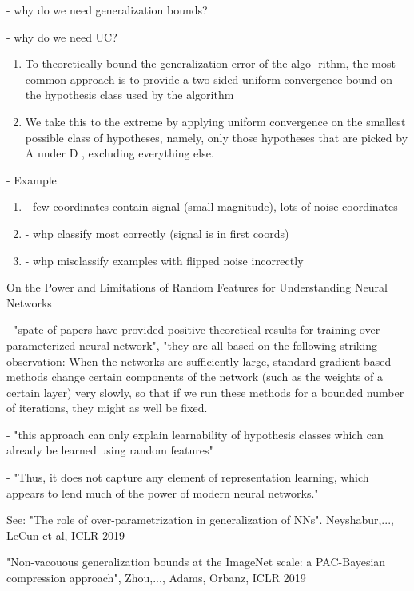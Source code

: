 \documentclass[english]{article}
\begin{document}
- why do we need generalization bounds?

- why do we need UC? 

\begin{enumerate}
\item To theoretically bound the generalization error of the algo-
rithm, the most common approach is to provide a two-sided
uniform convergence bound on the hypothesis class used
by the algorithm
\item We take this to the
extreme by applying uniform convergence on the smallest
possible class of hypotheses, namely, only those hypotheses
that are picked by A under D , excluding everything else.
\end{enumerate} 

 - Example

\begin{enumerate}
\item 
	- few coordinates contain signal (small magnitude), lots of noise coordinates
\item 	- whp classify most correctly (signal is in first coords)
\item 	- whp misclassify examples with flipped noise incorrectly 
\end{enumerate} 

\item On the Power and Limitations of Random Features
for Understanding Neural Networks

-  "spate of papers have provided positive theoretical results for training over-parameterized
neural network", "they are all based on the following striking observation: When the networks are sufficiently large, standard gradient-based methods change certain components of the network (such as the weights of a certain layer) very slowly, so
that if we run these methods for a bounded number of iterations, they might as well be fixed.

- "this
approach can only explain learnability of hypothesis classes which can already be learned using random
features"

- "Thus, it does not capture any
element of representation learning, which appears to lend much of the power of modern neural networks."



\item See: "The role of over-parametrization in generalization of NNs". Neyshabur,..., LeCun et al, ICLR 2019

"Non-vacouous generalization bounds at the ImageNet scale: a PAC-Bayesian compression approach", Zhou,..., Adams, Orbanz, ICLR 2019
\eenum
\end{document}
